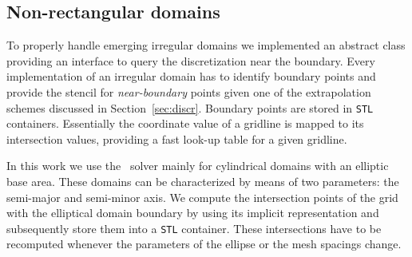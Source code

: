 \subsection*{Non-rectangular domains}

To properly handle emerging irregular domains we implemented an abstract
class providing an interface to query the discretization near the
boundary.  Every implementation of an irregular domain has to identify
boundary points and provide the stencil for \textit{near-boundary}
points given one of the extrapolation schemes discussed in
Section~\ref{sec:discr}.  Boundary points are stored in \texttt{STL}
containers. Essentially the coordinate value of a gridline is mapped to
its intersection values, providing a fast look-up table for a given
gridline.

In this work we use the \oursolver\ solver mainly for cylindrical domains with
an elliptic base area.  These domains can be characterized by means of
two parameters: the semi-major and semi-minor axis.  We compute the
intersection points of the grid with the elliptical domain boundary by
using its implicit representation and subsequently store them into a
\texttt{STL} container.  These intersections have to be recomputed
whenever the parameters of the ellipse or the mesh spacings change.





